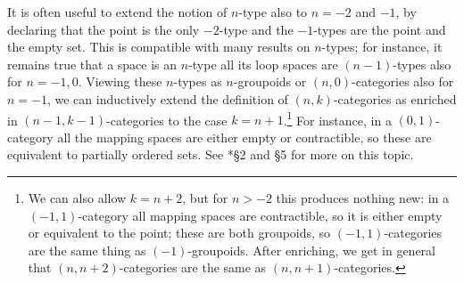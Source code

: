 \documentclass[a4paper,12pt]{article}
\begin{document}
\begin{remark}
  It is often useful to extend the notion of $n$-type also to $n = -2$
  and $-1$, by declaring that the point is the only $-2$-type and the
  $-1$-types are the point and the empty set. This is compatible with
  many results on $n$-types; for instance, it remains true that a
  space is an $n$-type \IFF{} all its loop spaces are $(n-1)$-types
  also for $n = -1,0$. Viewing these $n$-types as $n$-groupoids or
  $(n,0)$-categories also for $n = -1$, we can inductively extend the
  definition of $(n,k)$-categories as \icats{} enriched in
  $(n-1,k-1)$-categories to the case $k = n+1$.\footnote{We can also
    allow $k = n+2$, but for $n > -2$ this produces nothing new: in a
    $(-1,1)$-category all mapping spaces are contractible, so it is
    either empty or equivalent to the point; these are both groupoids,
    so $(-1,1)$-categories are the same thing as
    $(-1)$-groupoids. After enriching, we get in general that
    $(n,n+2)$-categories are the same as $(n,n+1)$-categories.}
  For instance, in a $(0,1)$-category all the
  mapping spaces are either empty or contractible, so these are
  equivalent to partially ordered sets. See \cite{BaezShulman}*{\S 2
    and \S 5} for more on this topic.
\end{remark}
\end{document}
